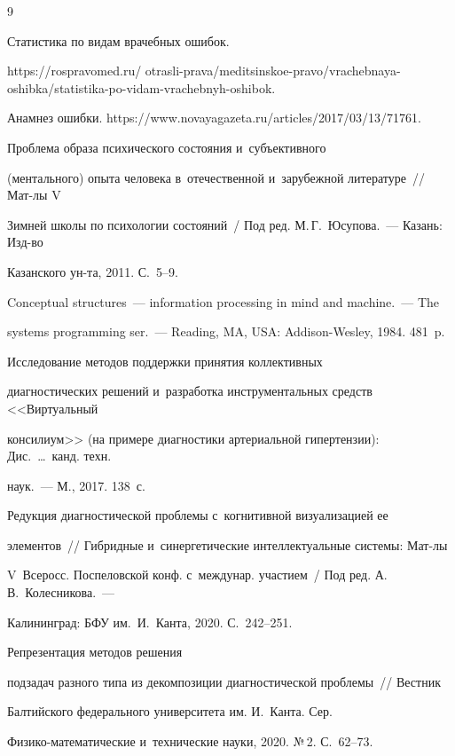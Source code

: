 {\small\frenchspacing

{%


\begin{thebibliography}{9}


 Статистика по видам врачебных ошибок. 

{\sf https://rospravomed.ru/ otrasli-prava/meditsinskoe-pravo/vrachebnaya-oshibka/statistika-po-vidam-vrachebnyh-oshibok.}


Анамнез ошибки. {\sf https://www.novayagazeta.ru/articles/2017/03/13/71761}.


 Проблема образа психического состояния и~субъективного 

(ментального) опыта человека в~отечественной и~зарубежной литературе~/\!\!/ Мат-лы V 

Зимней школы по психологии состояний~/ Под ред. М.\,Г.~Юсупова.~--- Казань: Изд-во 

Казанского ун-та, 2011. С.~5--9.


 Conceptual structures~--- information processing in mind and machine.~--- The 

systems programming ser.~--- Reading, MA, USA: Addison-Wesley, 1984. 481~p.


 Исследование методов поддержки принятия коллективных 

диагностических решений и~разработка инструментальных средств <<Виртуальный 

консилиум>> (на примере диагностики артериальной гипертензии): Дис.\ \ldots\ канд. техн. 

наук.~--- М., 2017. 138~с.


 Редукция диагностической проблемы с~когнитивной визуализацией ее 

элементов~/\!\!/ Гибридные и~синергетические интеллектуальные системы: Мат-лы 

V~Всеросс. Поспеловской конф. с~междунар. участием~/ Под ред. А.\,В.~Колесникова.~--- 

Калининград: БФУ им.\ И.~Канта, 2020. С.~242--251.


  Репрезентация методов решения 

подзадач разного типа из декомпозиции диагностической проб\-ле\-мы~/\!\!/ Вестник 

Балтийского федерального университета им. И.~Канта. Сер.  

Фи\-зи\-ко-ма\-те\-ма\-ти\-че\-ские и~технические науки, 2020. №\,2. С.~62--73.

       \end{thebibliography}

} }

